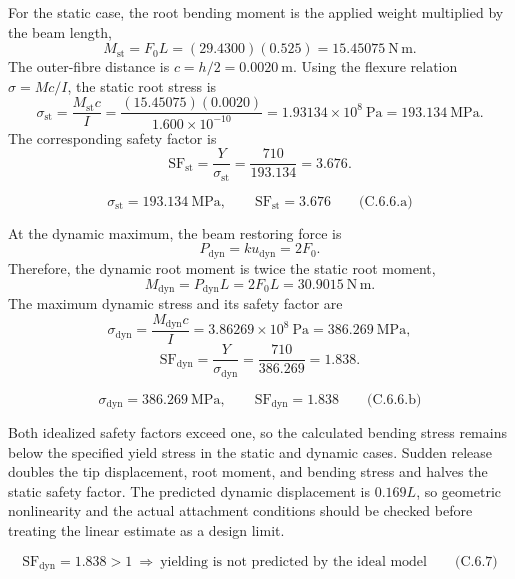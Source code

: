 \par\addvspace{0.35em}
For the static case, the root bending moment is the applied weight multiplied by the beam length,
\[
M_{\mathrm{st}}=F_0L=(29.4300)(0.525)=15.45075\ \mathrm{N\,m}.
\]
The outer-fibre distance is \(c=h/2=0.0020\ \mathrm{m}\). Using the flexure relation \(\sigma=Mc/I\), the static root stress is
\[
\sigma_{\mathrm{st}}
 =\frac{M_{\mathrm{st}}c}{I}
 =\frac{(15.45075)(0.0020)}{1.600\times10^{-10}}
 =1.93134\times10^8\ \mathrm{Pa}
 =193.134\ \mathrm{MPa}.
\]
The corresponding safety factor is
\[
\mathrm{SF}_{\mathrm{st}}
 =\frac{Y}{\sigma_{\mathrm{st}}}
 =\frac{710}{193.134}
 =3.676.
\]

\[
\boxed{\sigma_{\mathrm{st}}=193.134\ \mathrm{MPa},\qquad
\mathrm{SF}_{\mathrm{st}}=3.676}
\qquad\text{(C.6.6.a)}
\]

At the dynamic maximum, the beam restoring force is
\[
P_{\mathrm{dyn}}=ku_{\mathrm{dyn}}=2F_0.
\]
Therefore, the dynamic root moment is twice the static root moment,
\[
M_{\mathrm{dyn}}=P_{\mathrm{dyn}}L=2F_0L=30.9015\ \mathrm{N\,m}.
\]
The maximum dynamic stress and its safety factor are
\[
\sigma_{\mathrm{dyn}}
 =\frac{M_{\mathrm{dyn}}c}{I}
 =3.86269\times10^8\ \mathrm{Pa}
 =386.269\ \mathrm{MPa},
\]
\[
\mathrm{SF}_{\mathrm{dyn}}
 =\frac{Y}{\sigma_{\mathrm{dyn}}}
 =\frac{710}{386.269}
 =1.838.
\]

\[
\boxed{\sigma_{\mathrm{dyn}}=386.269\ \mathrm{MPa},\qquad
\mathrm{SF}_{\mathrm{dyn}}=1.838}
\qquad\text{(C.6.6.b)}
\]

Both idealized safety factors exceed one, so the calculated bending stress remains below the specified yield stress in the static and dynamic cases. Sudden release doubles the tip displacement, root moment, and bending stress and halves the static safety factor. The predicted dynamic displacement is \(0.169L\), so geometric nonlinearity and the actual attachment conditions should be checked before treating the linear estimate as a design limit.

\[
\boxed{\mathrm{SF}_{\mathrm{dyn}}=1.838>1\ \Rightarrow\ \text{yielding is not predicted by the ideal model}}
\qquad\text{(C.6.7)}
\]

\clearpage
{}

